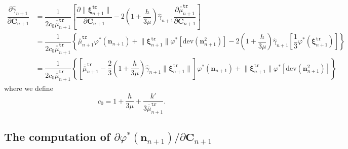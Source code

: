 \documentclass[preprint,11pt]{elsarticle}
\theoremstyle{definition}
\begin{document}
\begin{equation} \label{Partial gamma Partial C Final}
    \begin{array}{ll}
        \dfrac{\partial \widehat{\gamma}_{n+1}}{\partial \mathbf{C}_{n+1}} &= \dfrac{1}{2 c_0 \overline{\overline{\mu}}_{n+1}^\texttt{tr}} 
        \left[ \dfrac{\partial \lVert \boldsymbol{\xi}_{n+1}^\texttt{tr} \rVert}{\partial \mathbf{C}_{n+1}}
        - 2 \left( 1 + \dfrac{h}{3\mu} \right) \widehat{\gamma}_{n+1}
        \dfrac{\partial \overline{\overline{\mu}}_{n+1}^\texttt{tr}}{\partial \mathbf{C}_{n+1}} \right] \\[12pt]
        
        &= \dfrac{1}{2 c_0 \overline{\overline{\mu}}_{n+1}^\texttt{tr}}  
        \left\{ \overline{\overline{\mu}}_{n+1}^\texttt{tr} \varphi^*(\mathbf{n}_{n+1})
        + \lVert \boldsymbol{\xi}_{n+1}^\texttt{tr} \rVert \varphi^*\left[ \text{dev} (\mathbf{n}_{n+1}^2) \right]
        - 2 \left( 1 + \dfrac{h}{3\mu} \right) \widehat{\gamma}_{n+1}
        \left[ \dfrac{1}{3} \varphi^* \left( \boldsymbol{\xi}_{n+1}^\texttt{tr} \right) \right] \right\} \\[12pt]

        &= \dfrac{1}{2 c_0 \overline{\overline{\mu}}_{n+1}^\texttt{tr}} 
        \left\{ \left[ \overline{\overline{\mu}}_{n+1}^\texttt{tr} - \dfrac{2}{3} \left( 1 + \dfrac{h}{3\mu} \right) \widehat{\gamma}_{n+1} \lVert \boldsymbol{\xi}_{n+1}^\texttt{tr} \rVert \right] \varphi^* (\mathbf{n}_{n+1})
        + \lVert \boldsymbol{\xi}_{n+1}^\texttt{tr} \rVert \varphi^*\left[ \text{dev} (\mathbf{n}_{n+1}^2) \right] \right\}
    \end{array}
\end{equation}
where we define
\begin{equation*}
    c_0 =  1 + \dfrac{h}{3\mu} + \dfrac{k'}{3 \overline{\overline{\mu}}_{n+1}^\texttt{tr}}.
\end{equation*} 

\subsection[]{The computation of $\partial \varphi^*(\mathbf{n}_{n+1}) / \partial \mathbf{C}_{n+1}$} 
\end{document}
